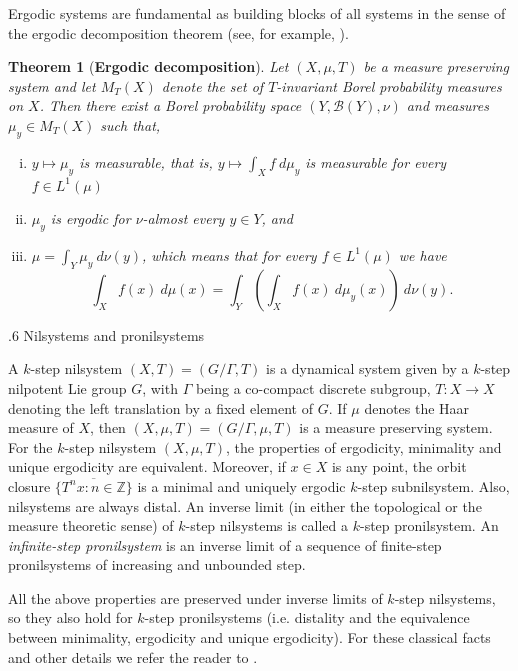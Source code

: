 \documentclass[reqno]{amsart}
\makeatletter
\def\Z{{\mathbb Z}}
\newtheorem{theorem}{Theorem}[section]
\theoremstyle{definition}
\def\subsection{\@startsection{subsection}{2}%
  \z@{.4\linespacing\@plus.7\linespacing}
{.6\baselineskip}%
  {\normalfont\centering\bfseries}%
}
\theoremstyle{remark}
\makeatother
\begin{document}
Ergodic systems are fundamental as building blocks of all systems 
in the sense of the ergodic decomposition theorem (see, for 
example, \cite[Theorem 6.2]{Einsiedler_Ward11}). 

\begin{theorem}[\textbf{Ergodic decomposition}]\label{ergodic decomposition}
Let $(X,\mu,T)$ be a measure preserving system and let $M_T(X)$ denote the set of $T$-invariant Borel probability measures on $X$. Then there exist a Borel probability space $(Y,\mathcal{B}(Y),\nu)$ and measures $\mu_y \in M_T(X)$ such that,
\begin{enumerate}[(i)]
\item $y \mapsto \mu_y$ is measurable, that is, $y \mapsto \int_X f\ d\mu_y$ is measurable for every $f\in L^1(\mu)$  
\item $\mu_y$ is ergodic for $\nu$-almost every $y\in Y$, and 
\item $\mu=\int_Y \mu_y\ d\nu(y)$, which means that for every $f\in L^1(\mu)$ we have
$$\int_X f(x)\ d\mu(x)=\int_Y \left( \int_X f(x) \ d\mu_y(x) \right)\ d\nu(y).$$  
\end{enumerate} 
\end{theorem}

\subsection{Nilsystems and pronilsystems}

A $k$-step nilsystem $(X,T) = (G/\Gamma,T)$ is a dynamical system given by a $k$-step nilpotent Lie group $G$, with $\Gamma$ being a co-compact discrete subgroup, $T \colon X \to X$ denoting the left translation by a fixed element of $G$. If $\mu$ denotes the Haar measure of $X$, then $(X,\mu,T) = (G/\Gamma,\mu,T)$ is a measure preserving system. For the $k$-step nilsystem $(X,\mu,T)$, the properties of ergodicity, minimality and unique ergodicity are equivalent. Moreover, if $x \in X$ is any point, the orbit closure $\overline {\{ T^n x \colon n \in \Z \}} $ is a minimal and uniquely ergodic $k$-step subnilsystem. Also, nilsystems are always distal. An inverse limit (in either the topological or the measure theoretic sense) of $k$-step nilsystems is called a $k$-step pronilsystem. An \emph{infinite-step pronilsystem} is an inverse limit of a sequence of finite-step pronilsystems of increasing and unbounded step.

All the above properties are preserved under inverse limits of $k$-step nilsystems, so they also hold for $k$-step pronilsystems (i.e. distality and the equivalence between minimality, ergodicity and unique ergodicity). For these classical facts and other details we refer the reader to \cite[Chapter 11 and Chapter 13]{Host_Kra_nilpotent_structures_ergodic_theory:2018}.  
\end{document}

